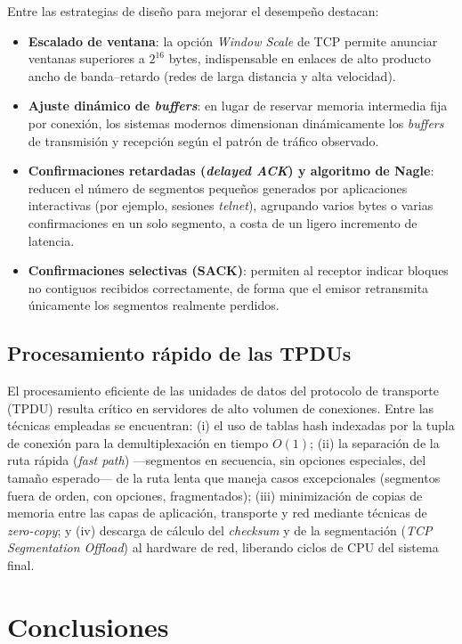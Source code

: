 \documentclass[conference]{IEEEtran}
\begin{document}
Entre las estrategias de diseño para mejorar el desempeño destacan:

\begin{itemize}
    \item \textbf{Escalado de ventana}: la opción \textit{Window Scale} de TCP permite anunciar ventanas superiores a $2^{16}$ bytes, indispensable en enlaces de alto producto ancho de banda--retardo (redes de larga distancia y alta velocidad).
    \item \textbf{Ajuste dinámico de \textit{buffers}}: en lugar de reservar memoria intermedia fija por conexión, los sistemas modernos dimensionan dinámicamente los \textit{buffers} de transmisión y recepción según el patrón de tráfico observado.
    \item \textbf{Confirmaciones retardadas (\textit{delayed ACK}) y algoritmo de Nagle}: reducen el número de segmentos pequeños generados por aplicaciones interactivas (por ejemplo, sesiones \textit{telnet}), agrupando varios bytes o varias confirmaciones en un solo segmento, a costa de un ligero incremento de latencia.
    \item \textbf{Confirmaciones selectivas (SACK)}: permiten al receptor indicar bloques no contiguos recibidos correctamente, de forma que el emisor retransmita únicamente los segmentos realmente perdidos.
\end{itemize}

\subsection{Procesamiento rápido de las TPDUs}

El procesamiento eficiente de las unidades de datos del protocolo de transporte (TPDU) resulta crítico en servidores de alto volumen de conexiones. Entre las técnicas empleadas se encuentran: (i) el uso de tablas hash indexadas por la tupla de conexión para la demultiplexación en tiempo $O(1)$; (ii) la separación de la ruta rápida (\textit{fast path}) —segmentos en secuencia, sin opciones especiales, del tamaño esperado— de la ruta lenta que maneja casos excepcionales (segmentos fuera de orden, con opciones, fragmentados); (iii) minimización de copias de memoria entre las capas de aplicación, transporte y red mediante técnicas de \textit{zero-copy}; y (iv) descarga de cálculo del \textit{checksum} y de la segmentación (\textit{TCP Segmentation Offload}) al hardware de red, liberando ciclos de CPU del sistema final.

\section{Conclusiones}
\end{document}

